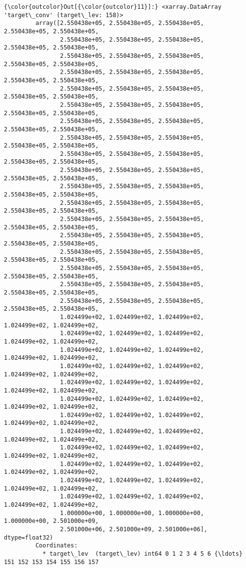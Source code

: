 \documentclass[11pt]{article}
\begin{document}
\begin{Verbatim}[commandchars=\\\{\}]
{\color{outcolor}Out[{\color{outcolor}11}]:} <xarray.DataArray 'target\_conv' (target\_lev: 158)>
         array([2.550438e+05, 2.550438e+05, 2.550438e+05, 2.550438e+05, 2.550438e+05,
                2.550438e+05, 2.550438e+05, 2.550438e+05, 2.550438e+05, 2.550438e+05,
                2.550438e+05, 2.550438e+05, 2.550438e+05, 2.550438e+05, 2.550438e+05,
                2.550438e+05, 2.550438e+05, 2.550438e+05, 2.550438e+05, 2.550438e+05,
                2.550438e+05, 2.550438e+05, 2.550438e+05, 2.550438e+05, 2.550438e+05,
                2.550438e+05, 2.550438e+05, 2.550438e+05, 2.550438e+05, 2.550438e+05,
                2.550438e+05, 2.550438e+05, 2.550438e+05, 2.550438e+05, 2.550438e+05,
                2.550438e+05, 2.550438e+05, 2.550438e+05, 2.550438e+05, 2.550438e+05,
                2.550438e+05, 2.550438e+05, 2.550438e+05, 2.550438e+05, 2.550438e+05,
                2.550438e+05, 2.550438e+05, 2.550438e+05, 2.550438e+05, 2.550438e+05,
                2.550438e+05, 2.550438e+05, 2.550438e+05, 2.550438e+05, 2.550438e+05,
                2.550438e+05, 2.550438e+05, 2.550438e+05, 2.550438e+05, 2.550438e+05,
                2.550438e+05, 2.550438e+05, 2.550438e+05, 2.550438e+05, 2.550438e+05,
                2.550438e+05, 2.550438e+05, 2.550438e+05, 2.550438e+05, 2.550438e+05,
                2.550438e+05, 2.550438e+05, 2.550438e+05, 2.550438e+05, 2.550438e+05,
                2.550438e+05, 2.550438e+05, 2.550438e+05, 2.550438e+05, 2.550438e+05,
                2.550438e+05, 2.550438e+05, 2.550438e+05, 2.550438e+05, 2.550438e+05,
                2.550438e+05, 2.550438e+05, 2.550438e+05, 2.550438e+05, 2.550438e+05,
                1.024499e+02, 1.024499e+02, 1.024499e+02, 1.024499e+02, 1.024499e+02,
                1.024499e+02, 1.024499e+02, 1.024499e+02, 1.024499e+02, 1.024499e+02,
                1.024499e+02, 1.024499e+02, 1.024499e+02, 1.024499e+02, 1.024499e+02,
                1.024499e+02, 1.024499e+02, 1.024499e+02, 1.024499e+02, 1.024499e+02,
                1.024499e+02, 1.024499e+02, 1.024499e+02, 1.024499e+02, 1.024499e+02,
                1.024499e+02, 1.024499e+02, 1.024499e+02, 1.024499e+02, 1.024499e+02,
                1.024499e+02, 1.024499e+02, 1.024499e+02, 1.024499e+02, 1.024499e+02,
                1.024499e+02, 1.024499e+02, 1.024499e+02, 1.024499e+02, 1.024499e+02,
                1.024499e+02, 1.024499e+02, 1.024499e+02, 1.024499e+02, 1.024499e+02,
                1.024499e+02, 1.024499e+02, 1.024499e+02, 1.024499e+02, 1.024499e+02,
                1.024499e+02, 1.024499e+02, 1.024499e+02, 1.024499e+02, 1.024499e+02,
                1.024499e+02, 1.024499e+02, 1.024499e+02, 1.024499e+02, 1.024499e+02,
                1.000000e+00, 1.000000e+00, 1.000000e+00, 1.000000e+00, 2.501000e+09,
                2.501000e+06, 2.501000e+09, 2.501000e+06], dtype=float32)
         Coordinates:
           * target\_lev  (target\_lev) int64 0 1 2 3 4 5 6 {\ldots} 151 152 153 154 155 156 157
\end{Verbatim}
            
\end{document}
